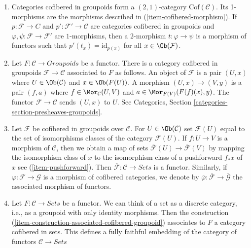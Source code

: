 \begin{remarks}
\begin{enumerate}
by $\Mor_\mathcal{C}(\mathcal{F}, \mathcal{F}')$.
\item
\label{formal-defos-item-definition-cofibered-groupoids-2-category}
Categories cofibered in groupoids form a $(2, 1)$-category
$\text{Cof}(\mathcal{C})$. Its 1-morphisms are the morphisms described in
(\ref{item-cofibered-morphism}). If $p : \mathcal{F} \to C$ and
$p': \mathcal{F}' \to \mathcal{C}$ are categories cofibered in groupoids
and $\varphi, \psi : \mathcal{F} \to \mathcal{F}'$ are $1$-morphisms, then
a 2-morphism $t : \varphi \to \psi$ is a morphism of functors such that
$p'(t_x) = \text{id}_{p(x)}$ for all $x \in \Ob(\mathcal{F})$.
\item
\label{formal-defos-item-construction-associated-cofibered-groupoid}
Let $F : \mathcal{C} \to \textit{Groupoids}$ be a functor. There
is a category cofibered in groupoids $\mathcal{F} \to \mathcal{C}$
associated to $F$ as follows. An object of $\mathcal{F}$ is a pair $(U, x)$
where $U \in \Ob(\mathcal{C})$ and $x \in \Ob(F(U))$. A
morphism $(U, x) \to (V, y)$ is a pair $(f, a)$ where
$f \in \Mor_\mathcal{C}(U, V)$ and
$a \in \Mor_{F(V)}(F(f)(x), y)$.
The functor $\mathcal{F} \to \mathcal{C}$ sends $(U, x)$ to $U$. See
Categories, Section \ref{categories-section-presheaves-groupoids}.
\item
\label{formal-defos-item-associated-functor-isomorphism-classes}
Let $\mathcal{F}$ be cofibered in groupoids over $\mathcal{C}$.
For $U \in \Ob(\mathcal{C})$ set $\overline{\mathcal{F}}(U)$ equal to
the set of isomorphisms classes of the category $\mathcal{F}(U)$.
If $f : U \to V$ is a morphism of $\mathcal{C}$, then we obtain a
map of sets $\overline{\mathcal{F}}(U) \to \overline{\mathcal{F}}(V)$ by
mapping the isomorphism class of $x$ to the isomorphism class of a pushforward
$f_*x$ of $x$ see (\ref{item-pushforward}). Then
$\overline{\mathcal{F}} : \mathcal{C} \to \textit{Sets}$ is a
functor. Similarly, if $\varphi : \mathcal{F} \to \mathcal{G}$ is a
morphism of cofibered categories, we denote by
$\overline{\varphi}: \overline{\mathcal{F}} \to  \overline{\mathcal{G}}$
the associated morphism of functors.
\item
\label{formal-defos-item-convention-cofibered-sets}
Let $F: \mathcal{C} \to \textit{Sets}$ be a functor. We can think of a
set as a discrete category, i.e., as a groupoid with only identity morphisms.
Then the construction (\ref{item-construction-associated-cofibered-groupoid})
associates to $F$ a category cofibered in sets. This defines a fully
faithful embedding of the category of functors $\mathcal{C} \to \textit{Sets}$

\end{enumerate}
\end{remarks}
